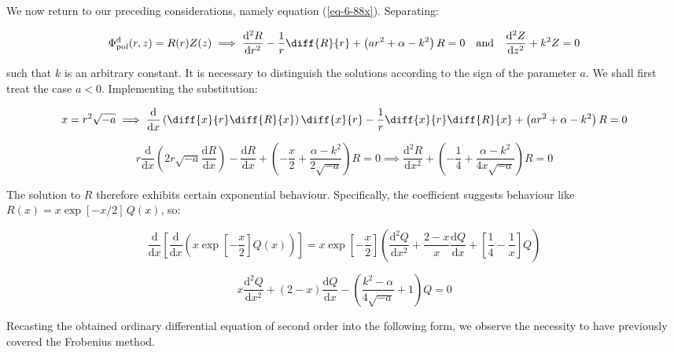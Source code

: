 We now return to our preceding considerations, namely equation (\ref{eq-6-88x}). Separating:

\begin{equation}
    \Phi_\text{pol}^\mathrm{d}(r,z)=R(r)Z(z)\implies\frac{\mathrm{d}^2R}{\mathrm{d}r^2}-\frac{1}{r}\diff{R}{r}+\left(ar^2+\alpha-k^2\right)R=0\quad\text{and}\quad\frac{\mathrm{d}^2Z}{\mathrm{d}z^2}+k^2Z=0
\end{equation}

such that $k$ is an arbitrary constant. It is necessary to distinguish the solutions according to the sign of the parameter $a$. We shall first treat the case $a<0$. Implementing the substitution:

\begin{equation}
    x=r^2\sqrt{-a}\implies\frac{\mathrm{d}}{\mathrm{d}x}\left(\diff{x}{r}\diff{R}{x}\right)\diff{x}{r}-\frac{1}{r}\diff{x}{r}\diff{R}{x}+\left(ar^2+\alpha-k^2\right)R=0
\end{equation}

\begin{equation}
    r\frac{\mathrm{d}}{\mathrm{d}x}\left(2r\sqrt{-a}\frac{\mathrm{d}R}{\mathrm{d}x}\right)-\frac{\mathrm{d}R}{\mathrm{d}x}+\left(-\frac{x}{2}+\frac{\alpha-k^2}{2\sqrt{-a}}\right)R=0\implies\frac{\mathrm{d}^2R}{\mathrm{d}x^2}+\left(-\frac{1}{4}+\frac{\alpha-k^2}{4x\sqrt{-a}}\right)R=0
\end{equation}

The solution to $R$ therefore exhibits certain exponential behaviour. Specifically, the coefficient suggests behaviour like $R(x)=x\exp{\left[-x/2\right]}\,Q(x)$, so:

\begin{equation}
    \frac{\mathrm{d}}{\mathrm{d}x}\left[\frac{\mathrm{d}}{\mathrm{d}x}\left(x\exp{\left[-\frac{x}{2}\right]}Q(x)\right)\right]=x\exp{\left[-\frac{x}{2}\right]}\left(\frac{\mathrm{d}^2Q}{\mathrm{d}x^2}+\frac{2-x}{x}\frac{\mathrm{d}Q}{\mathrm{d}x}+\left[\frac{1}{4}-\frac{1}{x}\right]Q\right)
\end{equation}

\begin{equation}
    x\frac{\mathrm{d}^2Q}{\mathrm{d}x^2}+(2-x)\frac{\mathrm{d}Q}{\mathrm{d}x}-\left(\frac{k^2-\alpha}{4\sqrt{-a}}+1\right)Q=0
\end{equation}

Recasting the obtained ordinary differential equation of second order into the following form, we observe the necessity to have previously covered the Frobenius method.

